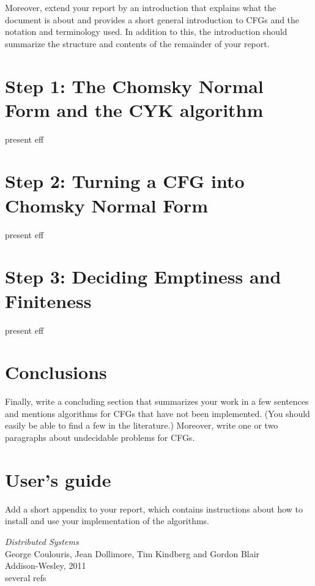 \documentclass[10pt, oneside]{article}
\begin{document}
Moreover, extend your report by an introduction that explains what the document
is about and provides a short general introduction to CFGs and the notation and
terminology used. In addition to this, the introduction should summarize the
structure and contents of the remainder of your report.


\section {Step 1: The Chomsky Normal Form and the CYK
algorithm}

present
eff

\section {Step 2: Turning a CFG into Chomsky Normal
Form}

present
eff

\section {Step 3: Deciding Emptiness and Finiteness}

present
eff

\section {Conclusions}

Finally, write a concluding section that summarizes your work in a few sentences
and mentions algorithms for CFGs that have not been implemented. (You should
easily be able to find a few in the literature.) Moreover, write one or two
paragraphs about undecidable problems for CFGs.

\appendix

\section {User's guide}

Add a short appendix to your report, which contains instructions about how to
install and use your implementation of the algorithms.


\begin{thebibliography}{9}

 \emph{Distributed Systems}\\
\newblock George Coulouris, Jean Dollimore, Tim Kindberg and Gordon Blair\\
\newblock Addison-Wesley, 2011\\

several refs

\end{thebibliography}
\end{document}
